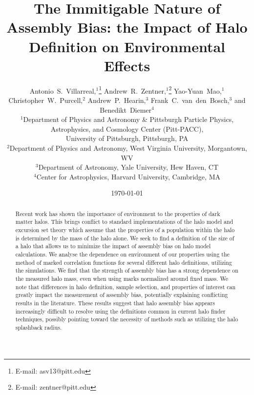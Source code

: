 \documentclass[usenatbib,fleqn]{mnras}
\begin{document}
\title[The Immitigable Nature of Assembly Bias]{The Immitigable Nature of Assembly
Bias: the Impact of Halo Definition on Environmental Effects}
\author[A.~S.~Villarreal et al.]{%
Antonio~S.~Villarreal,$^{1}$\thanks{E-mail: asv13@pitt.edu}
Andrew~R.~Zentner,$^{1}$\thanks{E-mail: zentner@pitt.edu}
Yao-Yuan~Mao,$^{1}$%
\newauthor
Christopher~W.~Purcell,$^{2}$%
Andrew~P.~Hearin,$^{3}$%
Frank~C.~van~den~Bosch,$^{3}$%
\newauthor
and Benedikt~Diemer$^{4}$%
\\
$^{1}$Department of Physics and Astronomy \& Pittsburgh Particle Physics, Astrophysics, and Cosmology Center (Pitt-PACC), \\
University of Pittsburgh, Pittsburgh, PA\\
$^{2}$Department of Physics and Astronomy, West Virginia University, Morgantown, WV \\
$^{3}$Department of Astronomy, Yale University, Hew Haven, CT\\
$^{4}$Center for Astrophysics, Harvard University, Cambridge, MA}

\date{\today}

\pagerange{\pageref{firstpage}--\pageref{lastpage}} 

\label{firstpage}

\maketitle

\begin{abstract}
Recent work has shown the importance of environment to the properties of dark matter halos. This brings conflict
to standard implementations of the halo model and excursion set theory which assume that the properties of a
population within the halo is determined by the mass of the halo alone. We seek to find a definition of the size
of a halo that allows us to minimize the impact of assembly bias on halo model calculations. We analyse the
dependence on environment of our properties using the method of marked correlation functions for several
different halo definitions, utilizing the \citet{diemer_kravtsov15} simulations. We find that the strength of assembly
bias has a strong dependence on the measured halo mass, even when using marks normalized around fixed mass. We note that differences in halo definition, sample selection, and properties of interest can greatly impact
the measurement of assembly bias, potentially explaining conflicting results in the literature. These results suggest that
halo assembly bias appears increasingly difficult to resolve using the definitions common in current halo finder techniques,
possibly pointing toward the necessity of methods such as utilizing the halo splashback radius.
\end{abstract}
\end{document}

